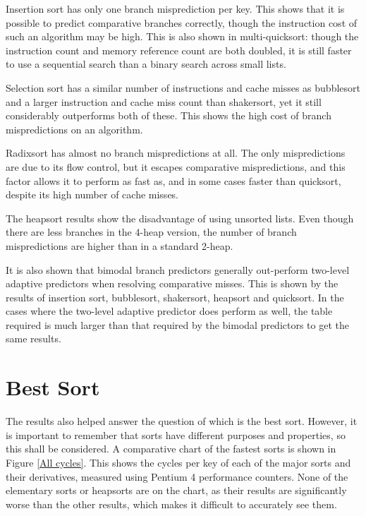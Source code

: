 Insertion sort has only one branch misprediction per key. This shows that it is
possible to predict comparative branches correctly, though the instruction cost
of such an algorithm may be high. This is also shown in multi-quicksort: though
the instruction count and memory reference count are both doubled, it is still
faster to use a sequential search than a binary search across small lists.

Selection sort has a similar number of instructions and cache misses as
bubblesort and a larger instruction and cache miss count than shakersort, yet it
still considerably outperforms both of these. This shows the high cost of branch
mispredictions on an algorithm.

Radixsort has almost no branch mispredictions at all. The only mispredictions
are due to its flow control, but it escapes comparative mispredictions, and this
factor allows it to perform as fast as, and in some cases faster than quicksort,
despite its high number of cache misses.

The heapsort results show the disadvantage of using unsorted lists. Even though
there are less branches in the 4-heap version, the number of branch
mispredictions are higher than in a standard 2-heap.

It is also shown that bimodal branch predictors generally out-perform two-level
adaptive predictors when resolving comparative misses. This is shown by the
results of insertion sort, bubblesort, shakersort, heapsort and quicksort. In
the cases where the two-level adaptive predictor does perform as well, the table
required is much larger than that required by the bimodal predictors to get the
same results.

\section{Best Sort}
The results also helped answer the question of which is the best sort. However,
it is important to remember that sorts have different purposes and properties,
so this shall be considered. A comparative chart of the fastest sorts is shown
in Figure \ref{All cycles}. This shows the cycles per key of each of the major
sorts and their derivatives, measured using Pentium 4 performance counters.
None of the elementary sorts or heapsorts are on the chart, as their results
are significantly worse than the other results, which makes it difficult to
accurately see them.

